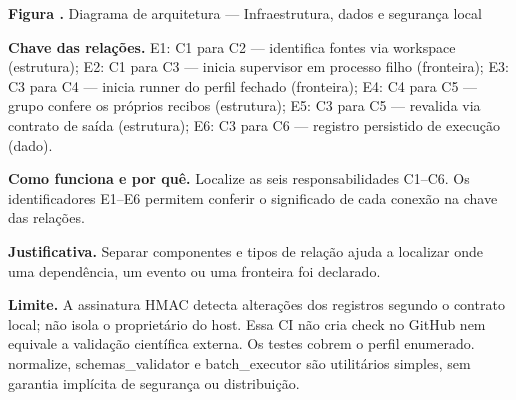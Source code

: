 {\small\textbf{Figura \thefigure.} Diagrama de arquitetura --- Infraestrutura, dados e segurança local}\par\smallskip
{\footnotesize\textbf{Chave das relações.} E1: C1 para C2 --- identifica fontes via workspace (estrutura); E2: C1 para C3 --- inicia supervisor em processo filho (fronteira); E3: C3 para C4 --- inicia runner do perfil fechado (fronteira); E4: C4 para C5 --- grupo confere os próprios recibos (estrutura); E5: C3 para C5 --- revalida via contrato de saída (estrutura); E6: C3 para C6 --- registro persistido de execução (dado).}\par\smallskip
\noindent\textbf{Como funciona e por quê.} Localize as seis responsabilidades C1--C6. Os identificadores E1--E6 permitem conferir o significado de cada conexão na chave das relações.\par
\noindent\textbf{Justificativa.} Separar componentes e tipos de relação ajuda a localizar onde uma dependência, um evento ou uma fronteira foi declarado.\par
\noindent\textbf{Limite.} A assinatura HMAC detecta alterações dos registros segundo o contrato local; não isola o proprietário do host. Essa CI não cria check no GitHub nem equivale a validação científica externa. Os testes cobrem o perfil enumerado. normalize, schemas\_validator e batch\_executor são utilitários simples, sem garantia implícita de segurança ou distribuição.\par\smallskip
{}
